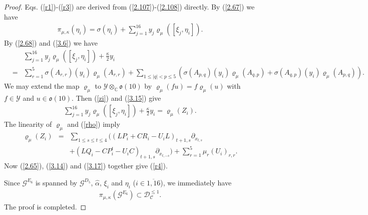\documentclass[12pt]{article}
\numberwithin{equation}{section}
\theoremstyle{definition}
\theoremstyle{remark}
\begin{document}
\begin{proof}
	Eqs. (\ref{r1})-(\ref{r3}) are derived from (\ref{2.107})-(\ref{2.108}) directly. By (\ref{2.67}) we have
	\begin{eqnarray}
		\pi_{\mu,\kappa}(\eta_i)=\sigma(\eta_i)+\sum\limits_{j=1}^{16}y_j\varrho_{\mu}([\xi_j,\eta_i]). \label{3.14}
	\end{eqnarray}
	By (\ref{2.68}) and (\ref{3.6}) we have
	\begin{eqnarray}
		\!\!&\!\!\!\!&\!\!\sum\limits_{j=1}^{16}y_j\varrho_{\mu}([\xi_j,\eta_i])+\frac{\kappa}{2}y_i\nonumber\\
		\!\!&\!\!=\!\!&\!\!\sum\limits_{r=1}^5\!\sigma(A_{r,r})(y_i)\varrho_{\mu}(A_{r,r})+\!\sum\limits_{1\leqslant |q|<p\leqslant 5}\! (\sigma(A_{p,q})(y_i)\varrho_{\mu}(A_{q,p})+\sigma(A_{q,p})(y_i)\varrho_{\mu}(A_{p,q})).\label{3.15}
	\end{eqnarray}
	We may extend the map $\varrho_{\mu}$ to $\mathscr{Y}\otimes_{\mathbb{C}}\mathfrak{o}(10)$ by $\varrho_{\mu}(fu)=f\varrho_{\mu}(u)$ with $f\in\mathscr{Y}$ and $u\in\mathfrak{o}(10)$. Then (\ref{zi}) and (\ref{3.15}) give
	\begin{eqnarray}
		\sum\limits_{j=1}^{16}y_j\varrho_{\mu}([\xi_j,\eta_i])+\frac{\kappa}{2}y_i=\varrho_{\mu}(Z_i).
	\end{eqnarray}
	The linearity of $\varrho_{\mu}$ and (\ref{rho}) imply
	\begin{eqnarray}
		\varrho_{\mu}(Z_i)&=&\sum\limits_{1\leqslant s\leqslant t\leqslant 4}\big((LP_i+CR_i-U_iL)_{t+1,s}\partial_{x_{t,s}}\nonumber\\
		&&+(LQ_i-CP_i^t-U_iC)_{t+1,s}\partial_{x_{t,-s}}\big)+\!\sum_{r=1}^5\!\mu_r(U_i)_{r,r}. \label{3.17}
	\end{eqnarray}
	Now (\ref{2.65}), (\ref{3.14}) and (\ref{3.17}) together give (\ref{r4}).
	
	Since $\mathscr{G}^{E_6}$ is spanned by $\mathscr{G}^{D_5}$, $\widehat{\alpha}$, $\xi_i$ and $\eta_i$ ($i\in\overline{1,16}$), we immediately have
	\begin{eqnarray}
		\pi_{\mu,\kappa}(\mathscr{G}^{E_6})\subset \mathscr{D}_{\mathscr{C}}^{\leqslant 1}.
	\end{eqnarray}
	The proof is completed.
\end{proof}
\end{document}
